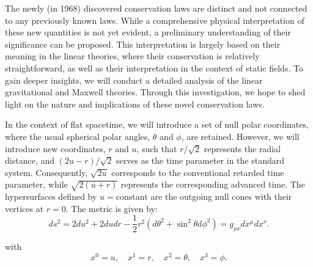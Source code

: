 The newly (in 1968) discovered conservation laws are distinct and not connected to any previously known laws. While a comprehensive physical interpretation of these new quantities is not yet evident, a preliminary understanding of their significance can be proposed. This interpretation is largely based on their meaning in the linear theories, where their conservation is relatively straightforward, as well as their interpretation in the context of static fields. To gain deeper insights, we will conduct a detailed analysis of the linear gravitational and Maxwell theories. Through this investigation, we hope to shed light on the nature and implications of these novel conservation laws.

In the context of flat spacetime, we will introduce a set of null polar coordinates, where the usual spherical polar angles, $\theta$ and $\phi$, are retained. However, we will introduce new coordinates, $r$ and $u$, such that $r/\sqrt{2}$ represents the radial distance, and $(2u - r)/\sqrt{2}$ serves as the time parameter in the standard system. Consequently, $\sqrt{2u}$ corresponds to the conventional retarded time parameter, while $\sqrt{2(u + r)}$ represents the corresponding advanced time. The hypersurfaces defined by $u = \text{constant}$ are the outgoing null cones with their vertices at $r = 0$. The metric is given by:
\begin{equation}\label{eq:flatmetric}
  d s^2 = 2d u^2 + 2dudr - \frac{1}{2} r^2(d\theta^{2} + \sin^2\theta d\phi^2) = g_{\mu \nu}dx^{\mu}dx^{\nu}.
\end{equation}

with 
\begin{equation}
  x^0 = u, \quad x^1 = r, \quad x^2 = \theta, \quad x^3 = \phi.
\end{equation}

